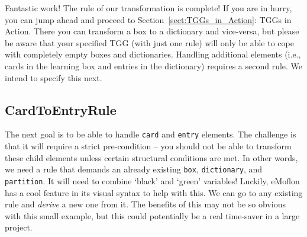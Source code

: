 Fantastic work! The rule of our transformation is complete! If you are in hurry, you can jump ahead and proceed to Section~\ref{sect:TGGs_in_Action}:
TGGs in Action. There you can transform a box to a dictionary and vice-versa, but please be aware that your specified TGG (with just one rule) will only be able
to cope with completely empty boxes and dictionaries. Handling additional elements (i.e., cards in the learning box and entries in the dictionary) requires a
second rule. We intend to specify this next.

\clearpage
\subsection{CardToEntryRule}

The next goal is to be able to handle \texttt{card} and \texttt{entry} elements. The challenge is that it will require a strict pre-condition -- you should not
be able to transform these child elements unless certain structural conditions are met. In other words, we need a rule that demands an already existing
\texttt{box}, \texttt{dictionary}, and \texttt{partition}. It will need to combine `black' and `green' variables! Luckily, eMoflon has a cool feature
in its visual syntax to help with this. We can go to any existing rule and \emph{derive} a new one from it. The benefits of this may not be so obvious with this
small example, but this could potentially be a real time-saver in a large project.

